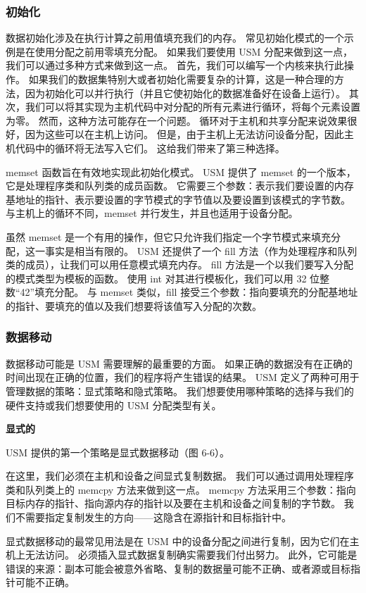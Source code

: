 \subsubsection{初始化}
数据初始化涉及在执行计算之前用值填充我们的内存。 常见初始化模式的一个示例是在使用分配之前用零填充分配。 如果我们要使用 USM 分配来做到这一点，我们可以通过多种方式来做到这一点。 首先，我们可以编写一个内核来执行此操作。 如果我们的数据集特别大或者初始化需要复杂的计算，这是一种合理的方法，因为初始化可以并行执行（并且它使初始化的数据准备好在设备上运行）。 其次，我们可以将其实现为主机代码中对分配的所有元素进行循环，将每个元素设置为零。 然而，这种方法可能存在一个问题。 循环对于主机和共享分配来说效果很好，因为这些可以在主机上访问。 但是，由于主机上无法访问设备分配，因此主机代码中的循环将无法写入它们。 这给我们带来了第三种选择。

memset 函数旨在有效地实现此初始化模式。 USM 提供了 memset 的一个版本，它是处理程序类和队列类的成员函数。 它需要三个参数：表示我们要设置的内存基地址的指针、表示要设置的字节模式的字节值以及要设置到该模式的字节数。 与主机上的循环不同，memset 并行发生，并且也适用于设备分配。

虽然 memset 是一个有用的操作，但它只允许我们指定一个字节模式来填充分配，这一事实是相当有限的。 USM 还提供了一个 fill 方法（作为处理程序和队列类的成员），让我们可以用任意模式填充内存。 fill 方法是一个以我们要写入分配的模式类型为模板的函数。 使用 int 对其进行模板化，我们可以用 32 位整数“42”填充分配。 与 memset 类似，fill 接受三个参数：指向要填充的分配基地址的指针、要填充的值以及我们想要将该值写入分配的次数。

\subsubsection{数据移动}
数据移动可能是 USM 需要理解的最重要的方面。 如果正确的数据没有在正确的时间出现在正确的位置，我们的程序将产生错误的结果。 USM 定义了两种可用于管理数据的策略：显式策略和隐式策略。 我们想要使用哪种策略的选择与我们的硬件支持或我们想要使用的 USM 分配类型有关。

\textbf{显式的}

USM 提供的第一个策略是显式数据移动（图 6-6）。

在这里，我们必须在主机和设备之间显式复制数据。 我们可以通过调用处理程序类和队列类上的 memcpy 方法来做到这一点。 memcpy 方法采用三个参数：指向目标内存的指针、指向源内存的指针以及要在主机和设备之间复制的字节数。 我们不需要指定复制发生的方向——这隐含在源指针和目标指针中。

显式数据移动的最常见用法是在 USM 中的设备分配之间进行复制，因为它们在主机上无法访问。 必须插入显式数据复制确实需要我们付出努力。 此外，它可能是错误的来源：副本可能会被意外省略、复制的数据量可能不正确、或者源或目标指针可能不正确。

